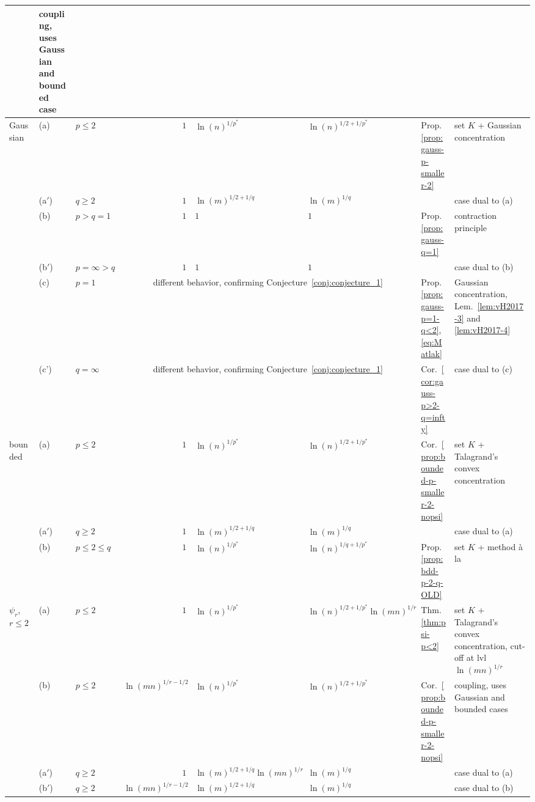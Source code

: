 \documentclass[a4paper]{amsart}
\theoremstyle{definition}
\theoremstyle{remark}
\numberwithin{equation}{section}
\begin{document}
{\begin{landscape}
\begin{table}
{\begin{tabular}{@{}lllrllll@{}}
&coupling, uses Gaussian and bounded case   \\
				\midrule
				Gaussian & (a)  &  $p \leq 2$ & $1$ & $\ln(n)^{1/p^*}$ & $\ln(n)^{1/2+1/p^*}$ &  Prop.~\ref{prop:gauss-p-smaller-2}& set $K$ + Gaussian concentration \\
				& (a$'$)   &   $q \geq 2$  & $1$ & $\ln(m)^{1/2+1/q}$ & $\ln(m)^{1/q}$ &   & case dual to (a)\\
				& (b)   &  $p> q =1$& $1$ & $1$ & $1$ & Prop.~\ref{prop:gauss-q=1}
&  contraction principle \\
				& (b$'$)   &  $p=\infty >q $  & $1$ & $1$ & $1$ & 
&  case dual to (b) \\
			& (c)   &  $ p=1$       &    \multicolumn{3}{c}{different behavior,  confirming Conjecture~\ref{conj:conjecture_1}}   &Prop.~\ref{prop:gauss-p=1-q<2},   \eqref{eq:Matlak} 
&Gaussian concentration, Lem.~\ref{lem:vH2017-3} and \ref{lem:vH2017-4} \\	& (c')   &   $q =\infty$     &    \multicolumn{3}{c}{different behavior,  confirming Conjecture~\ref{conj:conjecture_1}}   &Cor.~\ref{cor:gauss-p>2-q=infty}    
& case dual to (c) \\
				bounded  &(a)  & $ p\leq 2$ & $1$ & $\ln(n)^{1/p^*}$ & $\ln(n)^{1/2+1/p^*}$ &  Cor.~\ref{prop:bounded-p-smaller-2-nopsi}  &set $K$ +  Talagrand's convex concentration \\		
				 &(a$'$)  & $ q\geq 2$ & $ 1$ & $\ln(m)^{1/2+1/q}$ & $\ln(m)^{1/q}$  &     & case dual to (a)\\		
			 &(b)  & $ p\leq 2 \leq q$ & $1$ & $\ln(n)^{1/p^*}$ & $\ln(n)^{1/q+1/p^*}$ &  Prop.~\ref{prop:bdd-p-2-q-OLD}  &set $K$ +  method {\`a} la \cite{BGN} \\	
				$\psi_r$, $r\leq 2$ & (a)    &  $p \leq 2$           &  $1$  &   $\ln(n)^{1/p^*}$      &  $  \ln(n)^{1/2+ 1/p^*} \ln(mn)^{1/r} $     &    Thm.~\ref{thm:psi-p<2}
& \makecell[tl]{set $K$ +  Talagrand's convex concentration,\\  cut-off at lvl $ \ln(mn)^{1/r}$}     \\
				&  (b)   & $p \leq 2$   &       $\ln(mn)^{1/r-1/2}$ &     $\ln(n)^{1/p^*}$      &  $  \ln(n)^{1/2+ 1/p^*}  $     &   Cor.~\ref{prop:bounded-p-smaller-2-nopsi}
& coupling, uses Gaussian and bounded cases  \\
				& (a$'$) &  $q \geq 2$  &        $1$ &     $ \ln(m)^{1/2+1/q}\ln(mn)^{1/r} $    & $\ln(m)^{1/q}$ &        &  case dual to (a) \\
				& (b$'$) &   $q \geq 2$   &        $\ln(mn)^{1/r-1/2}$ &     $ \ln(m)^{1/2+1/q} $    & $\ln(m)^{1/q}$     &
& case dual to (b)  \\
				\bottomrule
			\end{tabular}
			\label{table:summary} %
		}
		\end{table}
	\end{landscape}
	\clearpage%
}
%
%
\end{document}
